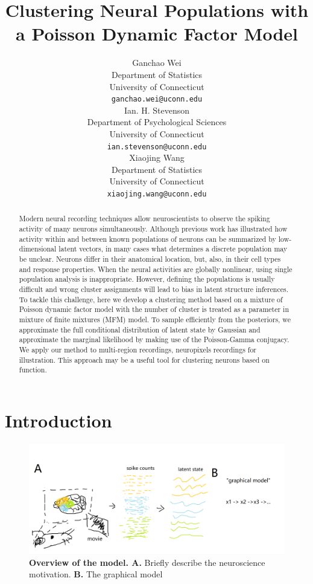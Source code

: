 \documentclass{article}
\title{Clustering Neural Populations with a Poisson Dynamic Factor Model}
\author{%
	Ganchao Wei\\
	Department of Statistics\\
	University of Connecticut\\
	\texttt{ganchao.wei@uconn.edu}\\
	\And
	Ian. H. Stevenson\\
	Department of Psychological Sciences\\
	University of Connecticut\\
	\texttt{ian.stevenson@uconn.edu} \\
	\And
	Xiaojing Wang\\
	Department of Statistics\\
	University of Connecticut\\
	\texttt{xiaojing.wang@uconn.edu} \\
}
\begin{document}
	
	\maketitle
	
	\begin{abstract}
	Modern neural recording techniques allow neuroscientists to observe the spiking activity of many neurons simultaneously. Although previous work has illustrated how activity within and between known populations of neurons can be summarized by low-dimensional latent vectors, in many cases what determines a discrete population may be unclear. Neurons differ in their anatomical location, but, also, in their cell types and response properties. When the neural activities are globally nonlinear, using single population analysis is inappropriate. However, defining the populations is usually difficult and  wrong cluster assignments will lead to bias in latent structure inferences. To tackle this challenge, here we develop a clustering method based on a mixture of Poisson dynamic factor model with the number of cluster is treated as a parameter in mixture of finite mixtures (MFM) model. To sample efficiently from the posteriors, we approximate the full conditional distribution of latent state by Gaussian and approximate the marginal likelihood by making use of the Poisson-Gamma conjugacy. We apply our method to multi-region recordings, neuropixels recordings for illustration. This approach may be a useful tool for clustering neurons based on function.
	\end{abstract}
	
	\section{Introduction}
	\label{intro}
	\answerTODO{}
	
	\begin{figure}[h!]
		\centering
		\includegraphics[width=1\textwidth]{figure1.png}
		\caption{\textbf{Overview of the model. A.} Briefly describe the neuroscience motivation. \textbf{B.} The graphical model}
	\end{figure}
	
\end{document}
